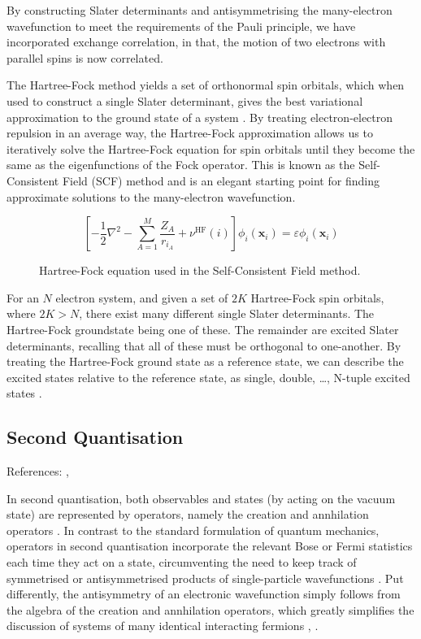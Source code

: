 By constructing Slater determinants and antisymmetrising the many-electron wavefunction to meet the requirements of the Pauli principle, we have incorporated exchange correlation, in that, the motion of two electrons with parallel spins is now correlated.

The Hartree-Fock method yields a set of orthonormal spin orbitals, which when used to construct a single Slater determinant, gives the best variational approximation to the ground state of a system \cite{Atilla1996}. By treating electron-electron repulsion in an average way, the Hartree-Fock approximation allows us to iteratively solve the Hartree-Fock equation for spin orbitals until they become the same as the eigenfunctions of the Fock operator. This is known as the Self-Consistent Field (SCF) method and is an elegant starting point for finding approximate solutions to the many-electron wavefunction.

\begin{figure}[H]
\centering
\begin{equation*}
\left[
-\frac{1}{2}\nabla^2 - \sum_{A=1}^M \frac{Z_A}{r_{i_A}} + \nu^\text{HF}(i)
\right]
\phi_i(\mathbf x_i) = \varepsilon \phi_i(\mathbf x_i)
\end{equation*}
\caption{Hartree-Fock equation used in the Self-Consistent Field method.}
\end{figure}

For an $N$ electron system, and given a set of $2K$ Hartree-Fock spin orbitals, where $2K > N$, there exist many different single Slater determinants. The Hartree-Fock groundstate being one of these. The remainder are excited Slater determinants, recalling that all of these must be orthogonal to one-another. By treating the Hartree-Fock ground state as a reference state, we can describe the excited states relative to the reference state, as single, double, \dots, N-tuple excited states \cite{Atilla1996}.

\subsection{\label{second-quantisation}Second Quantisation}
References: \cite{Helgaker2000}, \cite{Fetter1972}

In second quantisation, both observables and states (by acting on the vacuum state) are represented by operators, namely the creation and annhilation operators \cite{Helgaker2000}. In contrast to the standard formulation of quantum mechanics, operators in second quantisation incorporate the relevant Bose or Fermi statistics each time they act on a state, circumventing the need to keep track of symmetrised or antisymmetrised products of single-particle wavefunctions \cite{Fetter1972}. Put differently, the antisymmetry of an electronic wavefunction simply follows from the algebra of the creation and annhilation operators, which greatly simplifies the discussion of systems of many identical interacting fermions \cite{Helgaker2000}, \cite{Fetter1972}.

